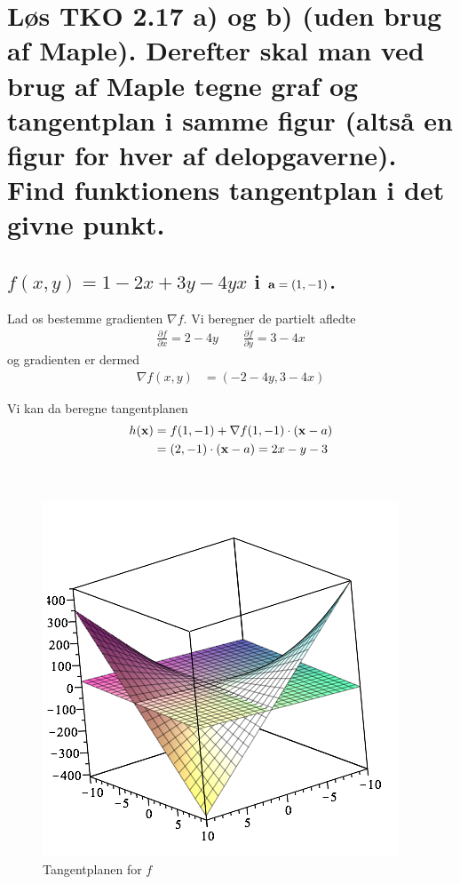 \documentclass[11pt,a4paper]{article}
\newcommand{\colbreak}{\vfill{\ }\columnbreak}
\begin{document}
\section
{
    \mdseries
    Løs TKO 2.17 a) og b) (uden brug af Maple). Derefter skal man ved brug af
    Maple tegne graf og tangentplan i samme figur (altså en figur for hver af
    delopgaverne).
    \\
    Find funktionens tangentplan i det givne punkt.
}

\subsection
{
    \mdseries $f(x,y) = 1 - 2x + 3y - 4yx$ i ${\bf a} = (1,-1)$.
}
\begin{multicols}{2}
    Lad os bestemme gradienten $\nabla f$. Vi beregner de partielt afledte
    \begin{align}
        \frac{\partial f}{\partial x} = 2 - 4y
        \qquad
        \frac{\partial f}{\partial y} = 3 - 4x
    \end{align}
    og gradienten er dermed
    \begin{align}
        \nabla f(x,y) &= (-2 - 4y, 3 - 4x)
    \end{align}

    Vi kan da beregne tangentplanen
    \begin{align}
        h({\bf x}) &= f(1,-1) + \nabla f(1,-1) \cdot ({\bf x} - a) \\
                   &= (2, -1) \cdot ({\bf x} - a)
                    = 2x - y - 3
    \end{align}

    \colbreak

    \begin{figure}[H]
        \centering
        \includegraphics[scale=0.26]{figures/7-2a.png}
        \caption{Tangentplanen for $f$}
        \label{fig:7-2a}
    \end{figure}

\end{multicols}
\end{document}
